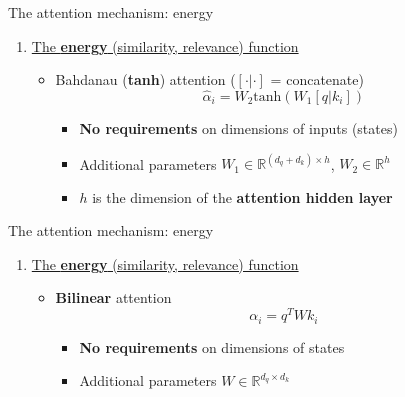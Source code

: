 \documentclass[12pt,aspectratio=169,handout]{beamer}
\newcounter{saveenumi}
\newcommand{\seti}{\setcounter{saveenumi}{\value{enumi}}}
\begin{document}
\begin{frame}{The attention mechanism: energy}
	\begin{enumerate}
		\item \underline{The \textbf{energy} (similarity, relevance) function}
		
		\begin{itemize}
			\item Bahdanau (\textbf{tanh}) attention ($[\cdot|\cdot]$ = concatenate)
				$$
					\hat{\alpha}_i = W_2 \text{tanh}(W_1 [q|k_i])
				$$
			\pause
			\begin{itemize}
				\item \textbf{No requirements} on dimensions of inputs (states)
				\item Additional parameters $W_1 \in \mathbb{R}^{(d_{q}+d_{k})\times h}$, $W_2 \in \mathbb{R}^{h}$
				\item $h$ is the dimension of the \textbf{attention hidden layer}
			\end{itemize}
		\end{itemize}
	\end{enumerate}
\end{frame}


\begin{frame}{The attention mechanism: energy}
	\begin{enumerate}
		\item \underline{The \textbf{energy} (similarity, relevance) function}
		\begin{itemize}
			\item \textbf{Bilinear} attention
			$$
				\alpha_i =q^T W k_i
			$$
			\pause
			\begin{itemize}
				\item \textbf{No requirements} on dimensions of states
				\item Additional parameters $W \in \mathbb{R}^{d_{q} \times d_{k}}$
			\end{itemize}
		\end{itemize}
		\seti
	\end{enumerate}
\end{frame}
\end{document}
